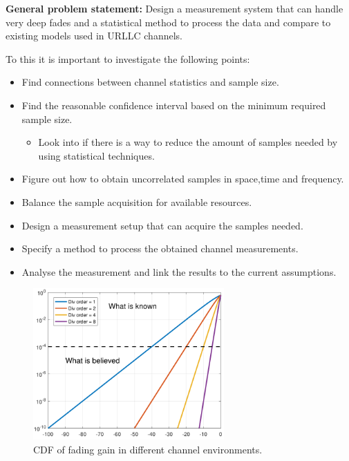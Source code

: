 \textbf{General problem statement:}
Design a measurement system that can handle very deep fades and a statistical method to process the data and compare to existing models used in URLLC channels.



To this it is important to investigate the following points: 
\begin{itemize}
	\item Find connections between channel statistics and sample size.
	\item Find the reasonable confidence interval based on the minimum required sample size.
	\begin{itemize}
	\item Look into if there is a way to reduce the amount of samples needed by using statistical techniques.
 	\end{itemize}
	\item Figure out how to obtain uncorrelated samples in space,time and frequency.
	\item Balance the sample acquisition for available resources. 
	\item Design  a measurement setup that can acquire the samples needed.
	\item Specify a method to process the obtained channel measurements.
	\item Analyse the measurement and link the results to the current assumptions.
\end{itemize}

\begin{figure}[H]
\centering
\includegraphics[width=0.65\textwidth]{figures/fading_gain.pdf}
\caption{\Gls{CDF} of fading gain in different channel environments.}
\label{fading_gain}
\end{figure}



